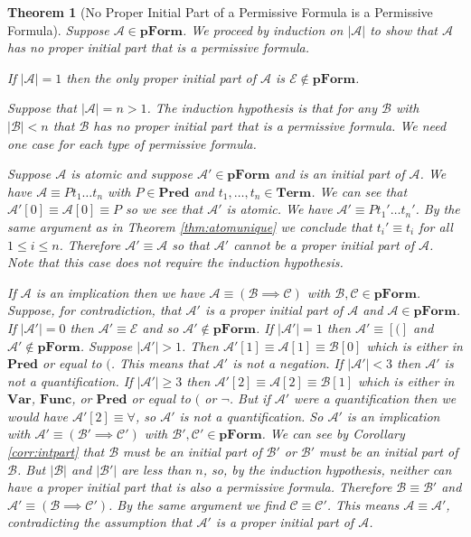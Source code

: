 \documentclass[12pt]{article}
\theoremstyle{break}
\theoremstyle{break}
\newtheorem{theorem}{Theorem}[section]
\theoremstyle{break}
\theoremstyle{break}
\theoremstyle{break}
\newtheorem{informal definition}[definition]{Informal Definition}
\newcommand{\mc}[1]{\mathcal{#1}}
\begin{document}
\begin{theorem}[No Proper Initial Part of a Permissive Formula is a Permissive Formula]
\label{thm:permpropinit}
Suppose $\mc{A}\in\textbf{pForm}$.
We proceed by induction on $|\mc{A}|$ to show that $\mc{A}$ has no proper initial part that is a permissive formula.

If $|\mc{A}| = 1$ then the only proper initial part of $\mc{A}$ is $\mc{E} \not \in \textbf{pForm}$.

Suppose that $|\mc{A}| = n>1$.
The induction hypothesis is that for any $\mc{B}$ with $|\mc{B}|<n$ that $\mc{B}$ has no proper initial part that is a permissive formula.
We need one case for each type of permissive formula.

Suppose $\mc{A}$ is atomic and suppose $\mc{A}'\in \textbf{pForm}$ and is an initial part of $\mc{A}$.
We have $\mc{A} \equiv Pt_1\ldots t_n$ with $P\in \textbf{Pred}$ and $t_1,\ldots,t_n\in\textbf{Term}$.
We can see that $\mc{A}'[0] \equiv \mc{A}[0] \equiv  P$ so we see that $\mc{A}'$ is atomic.
We have $\mc{A}' \equiv Pt_1'\ldots t_n'$.
By the same argument as in Theorem \ref{thm:atomunique} we conclude that $t_i' \equiv t_i$ for all $1 \le i \le n$.
Therefore $\mc{A}' \equiv \mc{A}$ so that $\mc{A}'$ cannot be a proper initial part of $\mc{A}$.
Note that this case does not require the induction hypothesis.

If $\mc{A}$ is an implication then we have $\mc{A} \equiv (\mc{B} \implies \mc{C})$ with $\mc{B}, \mc{C} \in \textbf{pForm}$.
Suppose, for contradiction, that $\mc{A}'$ is a proper initial part of $\mc{A}$ and $\mc{A}\in\textbf{pForm}$.
If $|\mc{A}'| = 0$ then $\mc{A}' \equiv \mc{E}$ and so $\mc{A}' \not \in \textbf{pForm}$.
If $|\mc{A}'| = 1$ then $\mc{A}' \equiv [(]$ and $\mc{A}' \not\in \textbf{pForm}$.
Suppose $|\mc{A}'|>1$.
Then $\mc{A}'[1] \equiv \mc{A}[1] \equiv \mc{B}[0]$ which is either in $\textbf{Pred}$ or equal to $($. This means that $\mc{A}'$ is not a negation.
If $|\mc{A}'| < 3$ then $\mc{A}'$ is not a quantification.
If $|\mc{A}'| \ge 3$ then $\mc{A}'[2] \equiv \mc{A}[2] \equiv \mc{B}[1]$ which is either in $\textbf{Var}$, $\textbf{Func}$, or $\textbf{Pred}$ or equal to $($ or $\lnot$. But if $\mc{A}'$ were a quantification then we would have $\mc{A}'[2] \equiv \forall$, so $\mc{A}'$ is not a quantification.
So $\mc{A}'$ is an implication with $\mc{A}' \equiv (\mc{B}' \implies \mc{C}')$ with $\mc{B}', \mc{C}' \in \textbf{pForm}$.
We can see by Corollary \ref{corr:intpart} that $\mc{B}$ must be an initial part of $\mc{B'}$ or $\mc{B}'$ must be an initial part of $\mc{B}$.
But $|\mc{B}|$ and $|\mc{B}'|$ are less than $n$, so, by the induction hypothesis, neither can have a proper initial part that is also a permissive formula.
Therefore $\mc{B} \equiv \mc{B}'$ and $\mc{A}' \equiv (\mc{B} \implies \mc{C}')$.
By the same argument we find $\mc{C} \equiv \mc{C}'$.
This means $\mc{A} \equiv \mc{A}'$, contradicting the assumption that $\mc{A}'$ is a proper initial part of $\mc{A}$.


\end{theorem}
\end{document}
